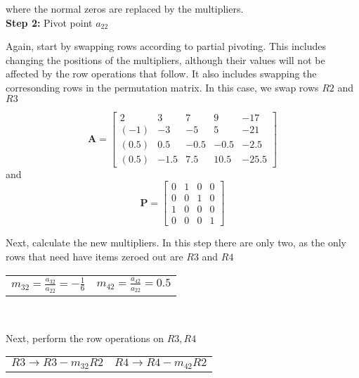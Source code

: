 \documentclass[11pt]{article}
\begin{document}
\begin{enumerate}
\begin{enumerate}[(a)]
				where the normal zeros are replaced by the multipliers. \\

				\textbf{Step 2:} Pivot point $a_{22}$

				Again, start by swapping rows according to partial pivoting. This includes changing the positions of the
				multipliers, although their values will not be affected by the row operations that follow. It also includes
				swapping the corresonding rows in the permutation matrix. In this case, we swap rows $R2$ and $R3$

				\[
					\mathbf{A} =
					\begin{bmatrix}
						2 & 3 & 7 & 9 & -17 \\
						(-1) & -3 & -5 & 5 & -21 \\
						(0.5) & 0.5 & -0.5 & -0.5 & -2.5 \\
						(0.5) & -1.5 & 7.5 & 10.5 & -25.5
					\end{bmatrix}
				\]
				and
				\[
					\mathbf{P} =
					\begin{bmatrix}
						0 & 1 & 0 & 0 \\
						0 & 0 & 1 & 0 \\
						1 & 0 & 0 & 0 \\
						0 & 0 & 0 & 1
					\end{bmatrix}
				\]

				Next, calculate the new multipliers. In this step there are only two, as the only rows that need have items
				zeroed out are $R3$ and $R4$

				\begin{center}
				\begin{tabular}{c||c}

					$m_{32} = \frac{a_{32}}{a_{22}} = -\frac{1}{6}$ &
					$m_{42} = \frac{a_{42}}{a_{22}} = 0.5$ \\
				\end{tabular} \\
				\end{center}

				Next, perform the row operations on $R3, R4$

				\begin{center}
				\begin{tabular}{c||c}

					$R3 \to R3 - m_{32}R2$ &
					$R4 \to R4 - m_{42}R2$ \\
				\end{tabular} \\
				\end{center}


\end{enumerate}
\end{enumerate}
\end{document}
